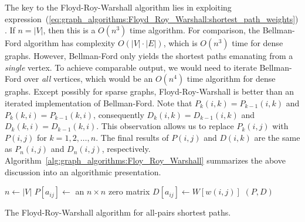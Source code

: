 The key to the Floyd-Roy-Warshall algorithm lies in exploiting
expression~(\ref{eq:graph_algorithms:Floyd_Roy_Warshall:shortest_path_weights}).
If $n = |V|$, then this is a $O(n^3)$ time algorithm. For
comparison, the Bellman-Ford algorithm has complexity
$O(|V| \cdot |E|)$, which is $O(n^3)$ time for dense graphs. However,
Bellman-Ford only yields the shortest paths emanating from a
\emph{single} vertex. To achieve comparable output, we would need to
iterate Bellman-Ford over \emph{all} vertices, which would be
an  $O(n^4)$ time algorithm for dense graphs. Except possibly for
sparse graphs, Floyd-Roy-Warshall is better than an iterated
implementation of Bellman-Ford. Note that $P_k(i,k) = P_{k-1}(i,k)$
and $P_k(k,i) = P_{k-1}(k,i)$, consequently $D_k(i,k) = D_{k-1}(i,k)$
and $D_k(k,i) = D_{k-1}(k,i)$. This observation allows us to replace
$P_k(i,j)$ with $P(i,j)$ for $k = 1, 2, \dots, n$. The final results of
$P(i,j)$ and $D(i,k)$ are the same as $P_n(i,j)$ and $D_n(i,j)$,
respectively. Algorithm~\ref{alg:graph_algorithms:Floy_Roy_Warshall}
summarizes the above discussion into an algorithmic presentation.

\begin{algorithm}[!htpb]
\dontprintsemicolon  %
\BlankLine
$n \leftarrow |V|$\;
$P[a_{ij}] \leftarrow$ an $n \times n$ zero matrix\;
$D[a_{ij}] \leftarrow W[w(i,j)]$\;
\Return $(P,D)$\;
\caption{The Floyd-Roy-Warshall algorithm for all-pairs shortest paths.}
\label{alg:graph_algorithms:Floy_Roy_Warshall}
\end{algorithm}

